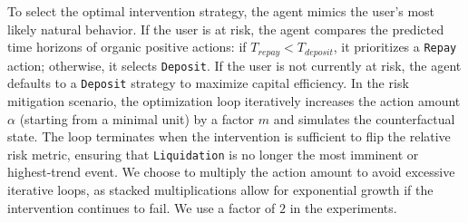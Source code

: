 \documentclass[manuscript,screen,review]{acmart}
\begin{document}
To select the optimal intervention strategy, the agent mimics the user's most likely natural behavior. If the user is at risk, the agent compares the predicted time horizons of organic positive actions: if $T_{repay} < T_{deposit}$, it prioritizes a \texttt{Repay} action; otherwise, it selects \texttt{Deposit}. If the user is not currently at risk, the agent defaults to a \texttt{Deposit} strategy to maximize capital efficiency. In the risk mitigation scenario, the optimization loop iteratively increases the action amount $\alpha$ (starting from a minimal unit) by a factor $m$ and simulates the counterfactual state. The loop terminates when the intervention is sufficient to flip the relative risk metric, ensuring that \texttt{Liquidation} is no longer the most imminent or highest-trend event. We choose to multiply the action amount to avoid excessive iterative loops, as stacked multiplications allow for exponential growth if the intervention continues to fail. We use a factor of $2$ in the experiments.
\end{document}
